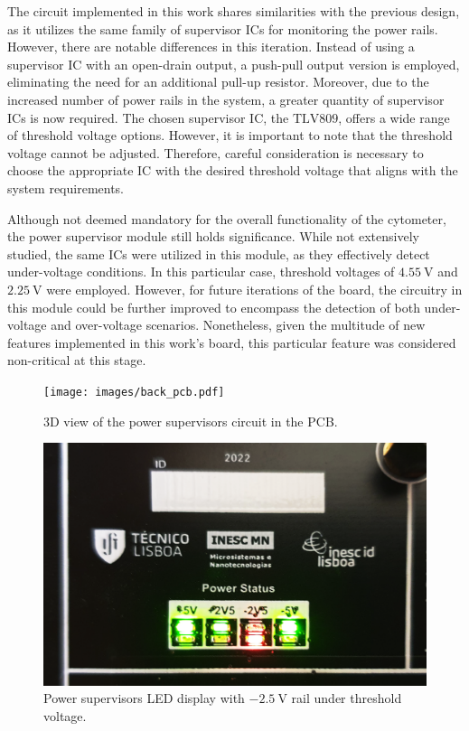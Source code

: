 The circuit implemented in this work shares similarities with the previous design, as it utilizes the same family of supervisor \ac{IC}s for monitoring the power rails. However, there are notable differences in this iteration. Instead of using a supervisor \ac{IC} with an open-drain output, a push-pull output version is employed, eliminating the need for an additional pull-up resistor. Moreover, due to the increased number of power rails in the system, a greater quantity of supervisor \ac{IC}s is now required. The chosen supervisor \ac{IC}, the $\mathrm{TLV809}$, offers a wide range of threshold voltage options. However, it is important to note that the threshold voltage cannot be adjusted. Therefore, careful consideration is necessary to choose the appropriate \ac{IC} with the desired threshold voltage that aligns with the system requirements.

Although not deemed mandatory for the overall functionality of the cytometer, the power supervisor module still holds significance. While not extensively studied, the same \ac{IC}s were utilized in this module, as they effectively detect under-voltage conditions. In this particular case, threshold voltages of $\mathrm{4.55~V}$ and $\mathrm{2.25~V}$ were employed. However, for future iterations of the board, the circuitry in this module could be further improved to encompass the detection of both under-voltage and over-voltage scenarios. Nonetheless, given the multitude of new features implemented in this work's board, this particular feature was considered non-critical at this stage.

\begin{figure}[!ht]
    \centering
    \begin{minipage}{0.45\textwidth}
        \centering
        \texttt{[image: images/back\_pcb.pdf]}
        \caption{3D view of the power supervisors circuit in the PCB.}
        \label{figure:supervisors-pcb}
    \end{minipage}\hfill
    \begin{minipage}{0.45\textwidth}
        \centering
        \includegraphics[width=\textwidth]{images/chapter_4/power/supervisors.png}
        \caption{Power supervisors LED display with $\mathrm{-2.5~V}$ rail under threshold voltage.}
        \label{figure:supervisors-func}
    \end{minipage}
\end{figure}

